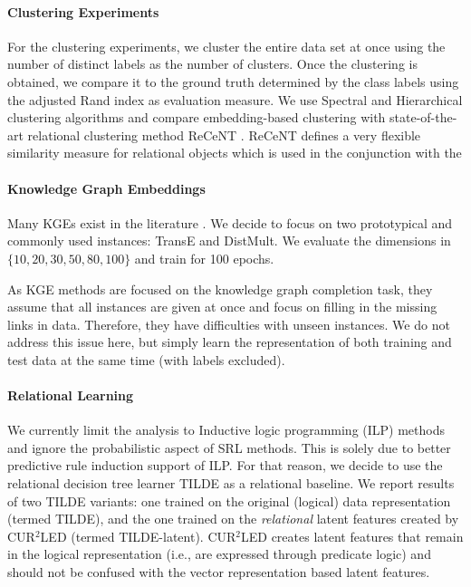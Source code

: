\paragraph{Clustering Experiments}
For the clustering experiments, we cluster the entire data set at once using the number of distinct labels as the number of clusters.
Once the clustering is obtained, we compare it to the ground truth determined by the class labels using the adjusted Rand index \cite{MoreyARI} as evaluation measure.
We use Spectral \cite{Spectral} and Hierarchical \cite{Agglomerative} clustering algorithms and compare embedding-based clustering with state-of-the-art relational clustering method ReCeNT \cite{Dumancic2017a}.
ReCeNT defines a very flexible similarity measure for relational objects which is used in the conjunction with the 


\paragraph{Knowledge Graph Embeddings}

Many KGEs exist in the literature \cite{EmbeddingsOverview}.
We decide to focus on two prototypical and commonly used instances: TransE  and DistMult. We evaluate the dimensions in $\{10, 20, 30, 50, 80, 100\}$ and train for 100 epochs.

As KGE methods are focused on the knowledge graph completion task, they assume that all instances are given at once and focus on filling in the missing links in data.
Therefore, they have difficulties with unseen instances.
We do not address this issue here, but simply learn the representation of both training and test data at the same time (with labels excluded).

\paragraph{Relational Learning}

We currently limit the analysis to Inductive logic programming (ILP) methods \cite{LucRLbook} and ignore the probabilistic aspect of SRL methods.
This is solely due to better predictive rule induction support of ILP.
For that reason, we decide to use the relational decision tree learner TILDE \cite{Blockeel1998285} as a relational  baseline.
We report results of two TILDE variants: one trained on the original (logical) data representation (termed TILDE), and the one trained on the \textit{relational} latent features created by CUR$^2$LED \cite{Dumancic2017} (termed TILDE-latent).
CUR$^2$LED creates latent features that remain in the logical representation (i.e., are expressed through predicate logic) and should not be confused with the vector representation based latent features.









